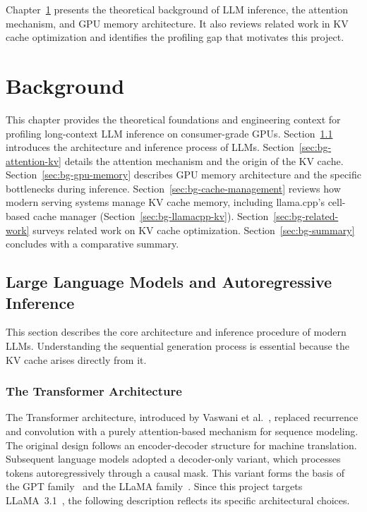 \documentclass[
english,                 %
bibtex,                  %
]{kththesis}
\numberwithin{listing}{chapter}
\begin{document}
Chapter~\ref{ch:background} presents the theoretical background of \gls{LLM} inference, the attention mechanism, and \gls{GPU} memory architecture. It also reviews related work in \gls{KV} cache optimization and identifies the profiling gap that motivates this project.

\chapter{Background}
\label{ch:background}


This chapter provides the theoretical foundations and engineering context for profiling long-context \gls{LLM} inference on consumer-grade \glspl{GPU}. Section~\ref{sec:bg-llm} introduces the architecture and inference process of \glspl{LLM}. Section~\ref{sec:bg-attention-kv} details the attention mechanism and the origin of the \gls{KV} cache. Section~\ref{sec:bg-gpu-memory} describes \gls{GPU} memory architecture and the specific bottlenecks during inference. Section~\ref{sec:bg-cache-management} reviews how modern serving systems manage \gls{KV} cache memory, including llama.cpp's cell-based cache manager (Section~\ref{sec:bg-llamacpp-kv}). Section~\ref{sec:bg-related-work} surveys related work on \gls{KV} cache optimization. Section~\ref{sec:bg-summary} concludes with a comparative summary.

\section{Large Language Models and Autoregressive Inference}
\label{sec:bg-llm}

This section describes the core architecture and inference procedure of modern \glspl{LLM}. Understanding the sequential generation process is essential because the \gls{KV} cache arises directly from it.

\subsection{The Transformer Architecture}
\label{sec:bg-transformer}

The Transformer architecture, introduced by Vaswani et al.~\cite{vaswani2017attention}, replaced recurrence and convolution with a purely attention-based mechanism for sequence modeling. The original design follows an encoder-decoder structure for machine translation. Subsequent language models adopted a decoder-only variant, which processes tokens autoregressively through a causal mask. This variant forms the basis of the GPT family~\cite{radford2019language, brown2020language} and the LLaMA family~\cite{touvron2023llama, dubey2024llama3}. Since this project targets LLaMA~3.1~\cite{dubey2024llama3}, the following description reflects its specific architectural choices.
\end{document}
